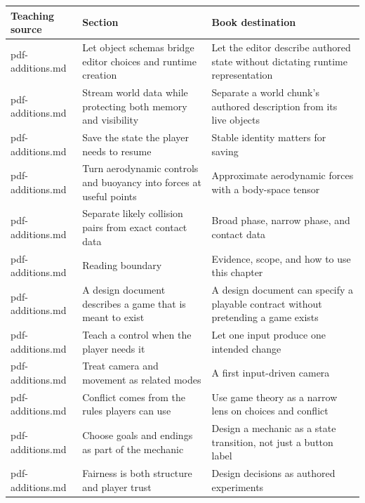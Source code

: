 {\def\LTcaptype{none} %
\begin{longtable}[]{@{}
  >{\raggedright\arraybackslash}p{}
  >{\raggedright\arraybackslash}p{}
  >{\raggedright\arraybackslash}p{}@{}}
\toprule\noalign{}
\begin{minipage}[b]{\linewidth}\raggedright
Teaching source
\end{minipage} & \begin{minipage}[b]{\linewidth}\raggedright
Section
\end{minipage} & \begin{minipage}[b]{\linewidth}\raggedright
Book destination
\end{minipage} \\
\midrule\noalign{}
\endhead
\bottomrule\noalign{}
\endlastfoot
pdf-additions.md & Let object schemas bridge editor choices and runtime creation & Let the editor describe authored state without dictating runtime representation \\
pdf-additions.md & Stream world data while protecting both memory and visibility & Separate a world chunk's authored description from its live objects \\
pdf-additions.md & Save the state the player needs to resume & Stable identity matters for saving \\
pdf-additions.md & Turn aerodynamic controls and buoyancy into forces at useful points & Approximate aerodynamic forces with a body-space tensor \\
pdf-additions.md & Separate likely collision pairs from exact contact data & Broad phase, narrow phase, and contact data \\
pdf-additions.md & Reading boundary & Evidence, scope, and how to use this chapter \\
pdf-additions.md & A design document describes a game that is meant to exist & A design document can specify a playable contract without pretending a game exists \\
pdf-additions.md & Teach a control when the player needs it & Let one input produce one intended change \\
pdf-additions.md & Treat camera and movement as related modes & A first input-driven camera \\
pdf-additions.md & Conflict comes from the rules players can use & Use game theory as a narrow lens on choices and conflict \\
pdf-additions.md & Choose goals and endings as part of the mechanic & Design a mechanic as a state transition, not just a button label \\
pdf-additions.md & Fairness is both structure and player trust & Design decisions as authored experiments \\
\end{longtable}
}

